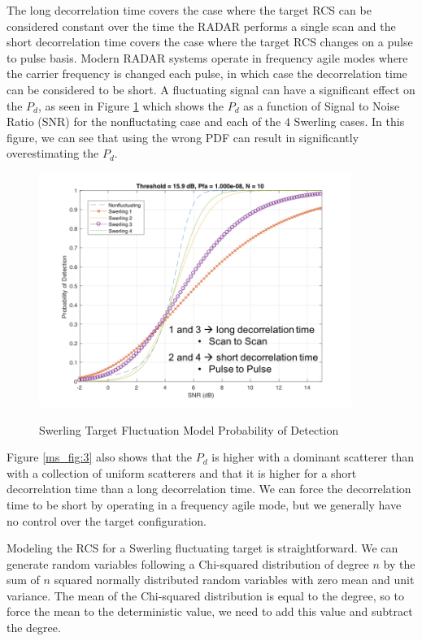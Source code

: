 The long decorrelation time covers the case where the target RCS can be considered constant over the time the RADAR performs a single scan and the short decorrelation time covers the case where the target RCS changes on a pulse to pulse basis. Modern RADAR systems operate in frequency agile modes where the carrier frequency is changed each pulse, in which case the decorrelation time can be considered to be short. A fluctuating signal can have a significant effect on the $P_d$, as seen in Figure \ref{env_fig:3} which shows the $P_d$ as a function of Signal to Noise Ratio (SNR) for the nonfluctating case and each of the $4$ Swerling cases. In this figure, we can see that using the wrong PDF can result in significantly overestimating the $P_d$.
\begin{figure}[H]
  \begin{center}
\includegraphics[width=4in]{../media/multistatic/swerling_pd.png}
  \end{center}
  \renewcommand{\baselinestretch}{1} \small\normalsize
  \begin{quote}
    \caption[Swerling Target Fluctuation Model Probability of Detection]{Swerling Target Fluctuation Model Probability of Detection\label{env_fig:3}}
  \end{quote}
\end{figure}
\renewcommand{\baselinestretch}{2} \small\normalsize

Figure \ref{ms_fig:3} also shows that the $P_d$ is higher with a dominant scatterer than with a collection of uniform scatterers and that it is higher for a short decorrelation time than a long decorrelation time. We can force the decorrelation time to be short by operating in a frequency agile mode, but we generally have no control over the target configuration.

Modeling the RCS for a Swerling fluctuating target is straightforward. We can generate random variables following a Chi-squared distribution of degree $n$ by the sum of $n$ squared normally distributed random variables with zero mean and unit variance. The mean of the Chi-squared distribution is equal to the degree, so to force the mean to the deterministic value, we need to add this value and subtract the degree.

